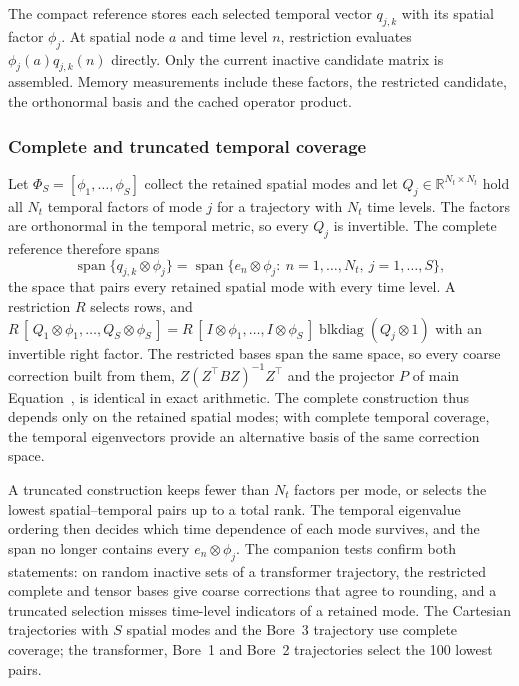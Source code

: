 The compact reference stores each selected temporal vector $q_{j,k}$
with its spatial factor $\phi_j$. At spatial node $a$ and time level $n$,
restriction evaluates $\phi_j(a)q_{j,k}(n)$ directly. Only the current
inactive candidate matrix is assembled. Memory measurements include
these factors, the restricted candidate, the orthonormal basis and the
cached operator product.

\subsubsection{Complete and truncated temporal coverage}
\label{si:temporal_coverage}
Let $\Phi_S=[\phi_1,\ldots,\phi_S]$ collect the retained spatial modes and let
$Q_j\in\mathbb R^{N_t\times N_t}$ hold all $N_t$ temporal factors of mode $j$ for a
trajectory with $N_t$ time levels. The factors are orthonormal in the temporal
metric, so every $Q_j$ is invertible. The complete reference therefore spans
\[
 \operatorname{span}\{q_{j,k}\otimes\phi_j\}
 =\operatorname{span}\{e_n\otimes\phi_j:\ n=1,\ldots,N_t,\ j=1,\ldots,S\},
\]
the space that pairs every retained spatial mode with every time level. A
restriction $R$ selects rows, and
$R\,[\,Q_1\otimes\phi_1,\ldots,Q_S\otimes\phi_S\,]
=R\,[\,I\otimes\phi_1,\ldots,I\otimes\phi_S\,]\operatorname{blkdiag}(Q_j\otimes 1)$
with an invertible right factor. The restricted bases span the same space, so every
coarse correction built from them, $Z(Z^\top BZ)^{-1}Z^\top$ and the projector $P$
of main Equation~, is identical in exact arithmetic.
The complete construction thus depends only on the retained spatial modes; with
complete temporal coverage, the temporal eigenvectors provide an alternative basis of the
same correction space.

A truncated construction keeps fewer than $N_t$ factors per mode, or selects the
lowest spatial--temporal pairs up to a total rank. The temporal eigenvalue ordering
then decides which time dependence of each mode survives, and the span no longer
contains every $e_n\otimes\phi_j$. The companion tests confirm both statements:
on random inactive sets of a transformer trajectory, the restricted complete and
tensor bases give coarse corrections that agree to rounding, and a truncated
selection misses time-level indicators of a retained mode. The Cartesian
trajectories with $S$ spatial modes and the Bore~3 trajectory use complete
coverage; the transformer, Bore~1 and Bore~2 trajectories select the 100 lowest
pairs.


